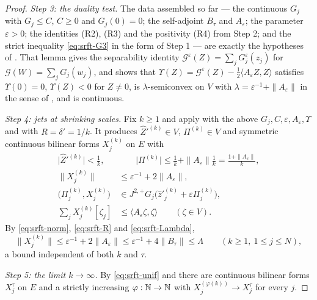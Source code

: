 \begin{proof}
\emph{Step 3: the duality test.}
The data assembled so far --- the continuous $G_j$ with $G_j\le C$, $C\ge0$ and
$G_j(0)=0$; the self-adjoint $B_\tau$ and $A_\varepsilon$; the parameter
$\varepsilon>0$; the identities (R2), (R3) and the positivity (R4) from Step 2;
and the strict inequality \eqref{eq:srft-G3} in the form of Step 1 --- are
exactly the hypotheses of . That lemma gives the
separability identity $\mathcal G^\varepsilon(Z)=\sum_jG_j^\varepsilon(z_j)$ for
$\mathcal G(W)=\sum_jG_j(w_j)$, and shows that
$\Upsilon(Z)=\mathcal G^\varepsilon(Z)
-\tfrac12\langle A_\varepsilon Z,Z\rangle$ satisfies $\Upsilon(0)=0$,
$\Upsilon(Z)<0$ for $Z\ne0$, is $\lambda$-semiconvex on $V$ with
$\lambda=\varepsilon^{-1}+\|A_\varepsilon\|$ in the sense of
, and is continuous.

\emph{Step 4: jets at shrinking scales.}
Fix $k\ge1$ and apply  with the above
$G_j,C,\varepsilon,A_\varepsilon,\Upsilon$ and with $R=\delta'=1/k$. It produces
$\widehat Z'^{(k)}\in V$, $\Pi^{(k)}\in V$ and symmetric continuous bilinear
forms $X_j^{(k)}$ on $E$ with
\begin{align}
  \bigl|\widehat Z'^{(k)}\bigr|<\tfrac1k,
  &\qquad
  \bigl|\Pi^{(k)}\bigr|\le\tfrac1k+\|A_\varepsilon\|\tfrac1k
   =\frac{1+\|A_\varepsilon\|}{k},\label{eq:srft-small}\\
  \bigl\|X_j^{(k)}\bigr\|&\le\varepsilon^{-1}+2\|A_\varepsilon\|,
    \label{eq:srft-norm}\\
  \bigl(\Pi_j^{(k)},X_j^{(k)}\bigr)
   &\in J^{2,+}G_j\bigl(\widehat z'^{(k)}_j
     +\varepsilon\Pi_j^{(k)}\bigr),\label{eq:srft-jet}\\
  \sum_jX_j^{(k)}[\zeta_j]
   &\le\langle A_\varepsilon\zeta,\zeta\rangle\qquad(\zeta\in V).
    \label{eq:srft-form}
\end{align}
By \eqref{eq:srft-norm}, \eqref{eq:srft-R} and \eqref{eq:srft-Lambda},
\begin{equation}\label{eq:srft-unif}
  \bigl\|X_j^{(k)}\bigr\|\le\varepsilon^{-1}+2\|A_\varepsilon\|
   \le\varepsilon^{-1}+4\|B_\tau\|\le\Lambda
  \qquad(k\ge1,\ 1\le j\le N),
\end{equation}
a bound independent of both $k$ and $\tau$.

\emph{Step 5: the limit $k\to\infty$.}
By \eqref{eq:srft-unif} and  there are
continuous bilinear forms $X_j^\tau$ on $E$ and a strictly increasing
$\varphi:\mathbb{N}\to\mathbb{N}$ with $X_j^{(\varphi(k))}\to X_j^\tau$ for every $j$.


\end{proof}
